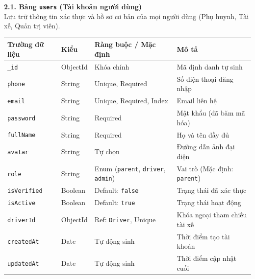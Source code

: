 \documentclass[../DoAn.tex]{subfiles}
\begin{document}
\textbf{2.1. Bảng \texttt{users} (Tài khoản người dùng)} \\
Lưu trữ thông tin xác thực và hồ sơ cơ bản của mọi người dùng (Phụ huynh, Tài xế, Quản trị viên).
\begin{table}[H]
    \centering
    \begin{tabular}{|l|l|p{4cm}|p{5cm}|}
        \hline
        \textbf{Trường dữ liệu} & \textbf{Kiểu} & \textbf{Ràng buộc / Mặc định}                           & \textbf{Mô tả}                      \\ \hline
        \texttt{\_id}           & ObjectId      & Khóa chính                                              & Mã định danh tự sinh                \\ \hline
        \texttt{phone}          & String        & Unique, Required                                        & Số điện thoại đăng nhập             \\ \hline
        \texttt{email}          & String        & Unique, Required, Index                                 & Email liên hệ                       \\ \hline
        \texttt{password}       & String        & Required                                                & Mật khẩu (đã băm mã hóa)            \\ \hline
        \texttt{fullName}       & String        & Required                                                & Họ và tên đầy đủ                    \\ \hline
        \texttt{avatar}         & String        & Tự chọn                                                 & Đường dẫn ảnh đại diện              \\ \hline
        \texttt{role}           & String        & Enum (\texttt{parent}, \texttt{driver}, \texttt{admin}) & Vai trò (Mặc định: \texttt{parent}) \\ \hline
        \texttt{isVerified}     & Boolean       & Default: \texttt{false}                                 & Trạng thái đã xác thực              \\ \hline
        \texttt{isActive}       & Boolean       & Default: \texttt{true}                                  & Trạng thái hoạt động                \\ \hline
        \texttt{driverId}       & ObjectId      & Ref: \texttt{Driver}, Unique                            & Khóa ngoại tham chiếu tài xế        \\ \hline
        \texttt{createdAt}      & Date          & Tự động sinh                                            & Thời điểm tạo tài khoản             \\ \hline
        \texttt{updatedAt}      & Date          & Tự động sinh                                            & Thời điểm cập nhật cuối             \\ \hline
    \end{tabular}
\end{table}
\end{document}
